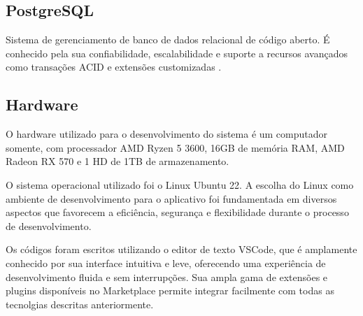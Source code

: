 \subsection{PostgreSQL}
Sistema de gerenciamento de banco de dados relacional de código aberto. É conhecido pela sua confiabilidade, escalabilidade e suporte a recursos avançados como transações ACID e extensões customizadas \cite{postgresql}.

\subsection{Hardware}
O hardware utilizado para o desenvolvimento do sistema é um computador somente, com processador AMD Ryzen 5 3600, 16GB de memória RAM, AMD Radeon RX 570 e 1 HD de 1TB de armazenamento.

O sistema operacional utilizado foi o Linux Ubuntu 22. A escolha do Linux como ambiente de desenvolvimento para o aplicativo foi fundamentada em diversos aspectos que favorecem a eficiência, segurança e flexibilidade durante o processo de desenvolvimento. 

Os códigos foram escritos utilizando o editor de texto VSCode, que é amplamente conhecido por sua interface intuitiva e leve, oferecendo uma experiência de desenvolvimento fluida e sem interrupções. Sua ampla gama de extensões e plugins disponíveis no Marketplace permite integrar facilmente com todas as tecnolgias descritas anteriormente.